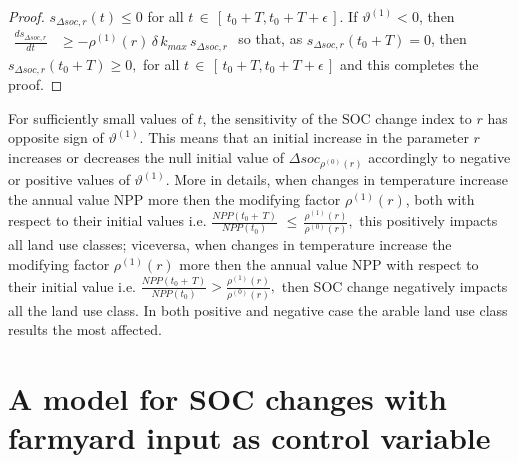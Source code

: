 \begin{proof}
$s_{\Delta soc,r}(t) \leq 0$ for all $t\,\in \,[\,t_0+T,t_0+T+\epsilon\,]$.
If $\vartheta^{(1)}< 0$, then 
$\begin{array}{ll}
\displaystyle \frac{d s_{\Delta soc,r} }{dt} 
&\geq  -\rho^{(1)}(r)\,\delta\,k_{max}\,s_{\Delta soc,r}
\end{array}$ so that, as $s_{\Delta soc,r}(t_0+T)=0$, then $s_{\Delta soc,r}(t_0+T)\geq 0,$ for all $t\,\in \,[\,t_0+T,t_0+T+\epsilon\,]$ and this completes the proof.
 \end{proof}
\begin{remark}
For sufficiently small values of $t$, the sensitivity of the SOC change index  to $r$ has opposite  sign of 
$\vartheta^{(1)}$. This means that 
 an initial increase in the parameter $r$ increases or decreases the null initial  value of $\Delta soc_{\rho^{(0)}(r)}$ accordingly to negative or positive values of  $\vartheta^{(1)}$. More in details,   when changes in temperature increase the annual value NPP  more then the modifying factor $\rho^{(1)}(r)$, both  with respect to their initial values i.e.
$
 \frac{NPP(t_0+\,T)}{NPP(t_0)} \, \,\leq \, \frac{\rho^{(1)}(r)}{\rho^{(0)}(r)},  
$
this positively impacts all land use classes; viceversa,  when changes in temperature increase the modifying factor $\rho^{(1)}(r)$ more then the annual value NPP with respect to their initial value i.e. 
$
   \frac{NPP(t_0+\,T)}{NPP(t_0)} >  \frac{\rho^{(1)}(r)}{\rho^{(0)}(r)},
$
then SOC change  negatively impacts all the land use class. In both positive and negative case the arable land use class results the  most affected.  
\end{remark}

\section{A model for SOC changes with farmyard input as control variable}\label{sec:5}

